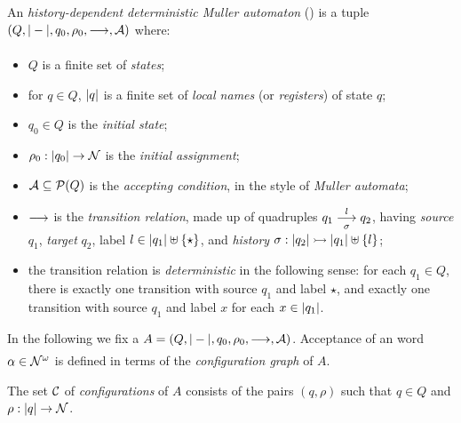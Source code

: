 
\begin{definition}\label{def:hdma}
 An \emph{history-dependent deterministic Muller automaton} (\hdma) is a tuple $(Q,|-|,q_0,\rho_0,\overset{}{\underset{}{\longrightarrow}},\mathcal{A})$
 where:
 \begin{itemize}
  \item $Q$ is a finite set of \emph{states};
  \item for $q \in Q$, $|q|$ is a finite set of \emph{local names} (or \emph{registers}) of state $q$;
  \item $q_0 \in Q$ is the \emph{initial state};
  \item $\rho_0 : |q_0| \to \mathcal{N}$ is the \emph{initial assignment};
  \item $\mathcal{A} \subseteq \mathcal{P}(Q)$ is the \emph{accepting condition}, in the style of \emph{Muller automata};
  \item $\overset{}{\underset{}{\longrightarrow}}$ is the \emph{transition relation}, made up of quadruples $q_1 \overset{l}{\underset{\sigma}{\longrightarrow}} q_2$, having \emph{source} $q_1$, \emph{target} $q_2$, label $l \in |q_1| \uplus \{\star\}$, and \emph{history} $\sigma : |q_2| \rightarrowtail |q_1| \uplus \{l\}$;
  \item the transition relation is \emph{deterministic} in the following sense: for each $q_1 \in Q$,   there is exactly one transition with source $q_1$ and label $\star$, and exactly one transition with source $q_1$ and label $x$ for each $x \in |q_1|$.
 \end{itemize}
\end{definition}
%
In the following we fix a \hdma{} $A = (Q,|-|,q_0,\rho_0,\overset{}{\underset{}{\longrightarrow}},\mathcal{A})$. Acceptance of an word $\alpha \in \mathcal{N}^\omega$ is defined in terms of the \emph{configuration graph} of $A$.

\begin{definition}
 The set $\mathcal{C}$ of \emph{configurations} of $A$ consists of the pairs $(q,\rho)$ such that $q \in Q$ and $\rho : |q| \to \mathcal{N}$.
\end{definition}

